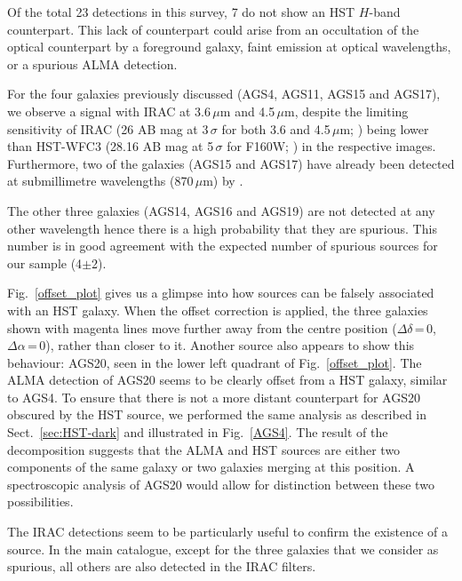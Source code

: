 \documentclass[longauth]{aa}
\begin{document}
Of the total 23 detections in this survey, 7 do not show an HST $H$-band counterpart. This lack of counterpart could arise from an occultation of the optical counterpart by a foreground galaxy, faint emission at optical wavelengths, or a spurious ALMA detection.         

For the four galaxies previously discussed (AGS4, AGS11, AGS15 and AGS17), we observe a signal with IRAC at 3.6\,$\mu$m and 4.5\,$\mu$m, despite the limiting sensitivity of IRAC (26 AB mag at 3\,$\sigma$ for both 3.6 and 4.5\,$\mu$m; \citealt{Ashby2015}) being lower than HST-WFC3 (28.16 AB mag at 5\,$\sigma$ for F160W; \citealt{Guo2013}) in the respective images. Furthermore, two of the galaxies (AGS15 and AGS17) have already been detected at submillimetre wavelengths (870\,$\mu$m) by \cite{Hodge2013}.

The other three galaxies (AGS14, AGS16 and AGS19) are not detected at any other wavelength hence there is a high probability that they are spurious. This number is in good agreement with the expected number of spurious sources for our sample (4$\pm$2). 

Fig.~\ref{offset_plot} gives us a glimpse into how sources can be falsely associated with an HST galaxy. When the offset correction is applied, the three galaxies shown with magenta lines move further away from the centre position ($\Delta \delta$\,=\,0, $\Delta \alpha$\,=\,0), rather than closer to it. Another source also appears to show this behaviour: AGS20, seen in the lower left quadrant of Fig.~\ref{offset_plot}. The ALMA detection of AGS20 seems to be clearly offset from a HST galaxy, similar to AGS4. To ensure that there is not a more distant counterpart for AGS20 obscured by the HST source, we performed the same analysis as described in Sect.~\ref{sec:HST-dark} and illustrated in Fig.~\ref{AGS4}. The result of the decomposition suggests that the ALMA and HST sources are either two components of the same galaxy or two galaxies merging at this position. A spectroscopic analysis of AGS20 would allow for distinction between these two possibilities.

The IRAC detections seem to be particularly useful to confirm the existence of a source. In the main catalogue, except for the three galaxies that we consider as spurious, all others are also detected in the IRAC filters.
\end{document}
